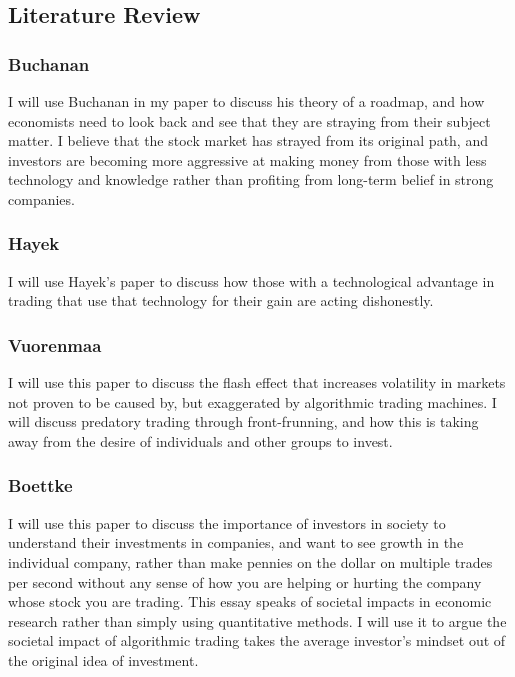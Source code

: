 \documentclass[11pt,]{article}
\begin{document}
\subsection{Literature Review}\label{literature-review}

\subsubsection{Buchanan}\label{buchanan-2}

I will use Buchanan in my paper to discuss his theory of a roadmap, and
how economists need to look back and see that they are straying from
their subject matter. I believe that the stock market has strayed from
its original path, and investors are becoming more aggressive at making
money from those with less technology and knowledge rather than
profiting from long-term belief in strong companies.

\subsubsection{Hayek}\label{hayek}

I will use Hayek's paper to discuss how those with a technological
advantage in trading that use that technology for their gain are acting
dishonestly. \citet{Hayek1945}

\subsubsection{Vuorenmaa}\label{vuorenmaa}

I will use this paper to discuss the flash effect that increases
volatility in markets not proven to be caused by, but exaggerated by
algorithmic trading machines. I will discuss predatory trading through
front-frunning, and how this is taking away from the desire of
individuals and other groups to invest. \citet{vuorenmaa2013good}

\subsubsection{Boettke}\label{boettke}

I will use this paper to discuss the importance of investors in society
to understand their investments in companies, and want to see growth in
the individual company, rather than make pennies on the dollar on
multiple trades per second without any sense of how you are helping or
hurting the company whose stock you are trading. This essay speaks of
societal impacts in economic research rather than simply using
quantitative methods. I will use it to argue the societal impact of
algorithmic trading takes the average investor's mindset out of the
original idea of investment. \citet{boettke2013riding}
\end{document}
